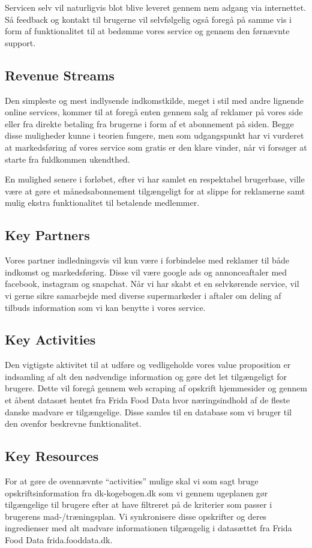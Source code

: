 \documentclass[a4paper,]{article}
\begin{document}
Servicen selv vil naturligvis blot blive leveret gennem nem adgang via internettet. Så feedback og kontakt til brugerne vil selvfølgelig også foregå på samme vis i form af funktionalitet til at bedømme vores service og gennem den førnævnte support.

\subsection{Revenue Streams}
Den simpleste og mest indlysende indkomstkilde, meget i stil med andre lignende online services, kommer til at foregå enten gennem salg af reklamer på vores side eller fra direkte betaling fra brugerne i form af et abonnement på siden. Begge disse muligheder kunne i teorien fungere, men som udgangspunkt har vi vurderet at markedsføring af vores service som gratis er den klare vinder, når vi forsøger at starte fra fuldkommen ukendthed. 

En mulighed senere i forløbet, efter vi har samlet en respektabel brugerbase, ville være at gøre et månedsabonnement tilgængeligt for at slippe for reklamerne samt mulig ekstra funktionalitet til betalende medlemmer. 

\subsection{Key Partners}
Vores partner indledningsvis vil kun være i forbindelse med reklamer til både indkomst og markedsføring. Disse vil være google ads og annonceaftaler med facebook, instagram og snapchat. Når vi har skabt et en selvkørende service, vil vi gerne sikre samarbejde med diverse supermarkeder i aftaler om deling af tilbuds information som vi kan benytte i vores service.

\subsection{Key Activities}
Den vigtigste aktivitet til at udføre og vedligeholde vores value proposition er indsamling af alt den nødvendige information og gøre det let tilgængeligt for brugere. Dette vil foregå gennem web scraping af opskrift hjemmesider og gennem et åbent datasæt hentet fra Frida Food Data hvor næringsindhold af de fleste danske madvare er tilgængelige. Disse samles til en database som vi bruger til den ovenfor beskrevne funktionalitet. 

\subsection{Key Resources}
For at gøre de ovennævnte “activities” mulige skal vi som sagt bruge opskriftsinformation fra dk-kogebogen.dk som vi gennem ugeplanen gør tilgængelige til brugere efter at have filtreret på de kriterier som passer i brugerens mad-/træningsplan. Vi synkronisere disse opskrifter og deres ingredienser med alt madvare informationen tilgængelig i datasættet fra Frida Food Data frida.fooddata.dk.
\end{document}
